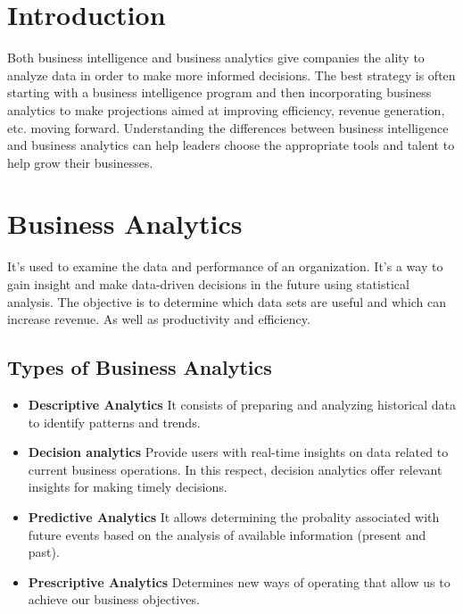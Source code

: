 \documentclass{article}
\begin{document}
\newpage 


\begin{multicols}{2}

\section{Introduction}

Both business intelligence and business analytics give companies the ality to analyze data in order to make more informed decisions. The best strategy is often starting with a business intelligence program and then incorporating business analytics to make projections aimed at improving efficiency, revenue generation, etc. moving forward.
Understanding the differences between business intelligence and business analytics can help leaders choose the appropriate tools and talent to help grow their businesses. 


\section{Business Analytics}
It's used to examine the data and performance of an organization. It's a way to gain insight and make data-driven decisions in the future using statistical analysis.
The objective is to determine which data sets are useful and which can increase revenue. As well as productivity and efficiency.


\subsection{Types of Business Analytics}
\begin{itemize}
\item \textbf{ Descriptive Analytics}
It consists of preparing and analyzing historical data to identify patterns and trends.

\item \textbf{ Decision analytics}
Provide users with real-time insights on data related to current business operations. In this respect, decision analytics offer relevant insights for making timely decisions.

\item \textbf{ Predictive Analytics}
It allows determining the probality associated with future events based on the analysis of available information (present and past).

\item \textbf{ Prescriptive Analytics}
Determines new ways of operating that allow us to achieve our business objectives.
\end{itemize}



\end{multicols}
\end{document}
